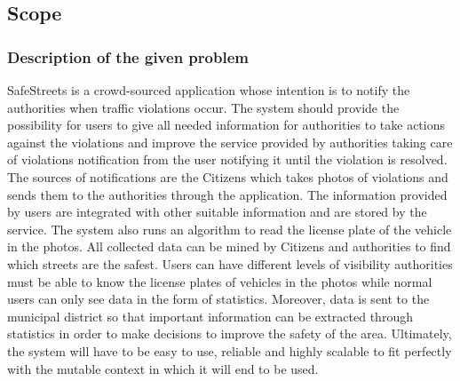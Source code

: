 \subsection{Scope}
\subsubsection{Description of the given problem}
SafeStreets is a crowd-sourced application whose intention is to notify the authorities when traffic violations occur. The system should provide the possibility for users to give all needed information for authorities to take actions against the violations and improve the service provided by authorities taking care of violations notification from the user notifying it until the violation is resolved. 
The sources of notifications are the Citizens which takes photos of violations and sends them to the authorities through the application.
The information provided by users are integrated with other suitable information and are stored by the service.
The system also runs an algorithm to read the license plate of the vehicle in the photos. All collected data can be mined by Citizens and authorities to find which streets are the safest. Users can have different levels of visibility authorities must be able to know the license plates of vehicles in the photos while normal users can only see data in the form of statistics.
Moreover, data is sent to the municipal district so that important information can be extracted through statistics in order to make decisions to improve the safety of the area.
Ultimately, the system will have to be easy to use, reliable and highly scalable to fit perfectly with the mutable context in which it will end to be used.

